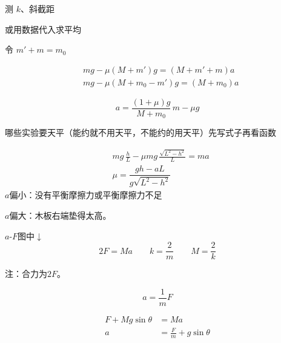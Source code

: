 测 $k$、斜截距  %

或用数据代入求平均

令 $m'+m=m_0$

\begin{align*}
& mg-\mu(M+m')g=(M+m'+m)a \\
& mg-\mu(M+m_0-m')g=(M+m_0)a %
\end{align*}

\[
a=\dfrac{(1+\mu)g}{M+m_0}\,m-\mu g %
\]

哪些实验要天平（能约就不用天平，不能约的用天平）\qquad 先写式子再看函数


\begin{align*}
& mg\,\frac{h}{L}-\mu mg\,\frac{\sqrt{L^2-h^2}}{L}=ma \\
& \mu=\dfrac{gh-aL}{g\sqrt{L^2-h^2}}
\end{align*}
$a$偏小：没有平衡摩擦力或平衡摩擦力不足

$a$偏大：木板右端垫得太高。


$a$-$F$图中$\downarrow$
\[2F=Ma\qquad k=\frac{2}{m}\qquad M=\frac{2}{k}\] %

注：合力为$2F$。

\[a=\frac{1}{m}F\]

\begin{align*}
F+Mg\sin\theta&=Ma\\
a&=\frac{F}{m}+g\sin\theta %
\end{align*}

